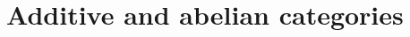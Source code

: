 \documentclass[../../../main]{subfiles}
\begin{document}
\chapter{Additive and abelian categories}






\end{document}
